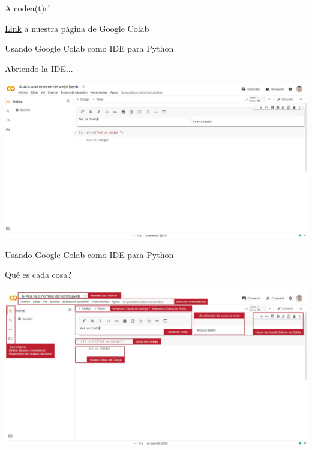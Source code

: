 \documentclass{beamer}
\begin{document}
\begin{frame}{A codea(t)r!}
\begin{block}

\textcolor{blue}{\href{https://colab.research.google.com/drive/1pssmr5FRjDoYxt3-iadaxa-ek3ZmFwPx?usp=sharing}{Link}} a nuestra página de Google Colab	
	
\end{block}
\end{frame}


\begin{frame}{Usando Google Colab como IDE para Python}
\begin{block}{Abriendo la IDE...}
\end{block}
\includegraphics[scale = 0.23]{recursos/colab_raw.jpeg}
\end{frame}


\begin{frame}{Usando Google Colab como IDE para Python}
\begin{block}{Qué es cada cosa?}
\end{block}
\includegraphics[scale = 0.23]{recursos/colab_edit.jpeg}
\end{frame}
\end{document}
